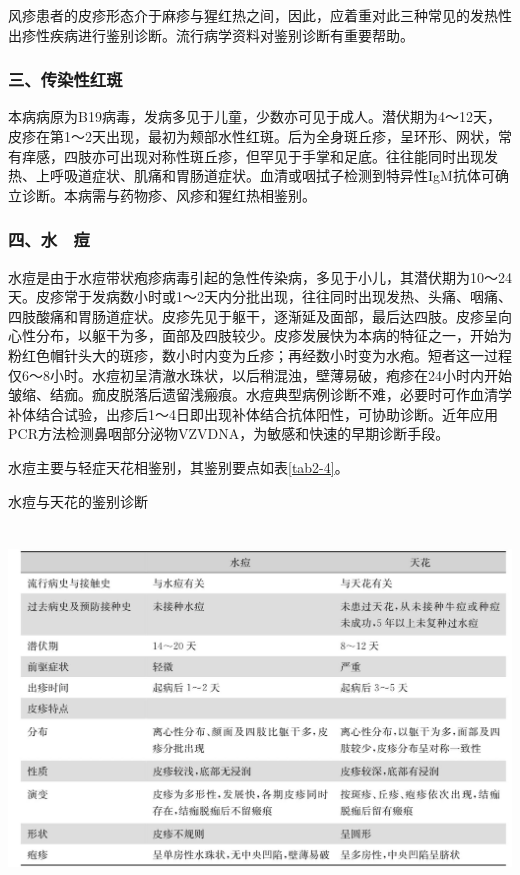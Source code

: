 风疹患者的皮疹形态介于麻疹与猩红热之间，因此，应着重对此三种常见的发热性出疹性疾病进行鉴别诊断。流行病学资料对鉴别诊断有重要帮助。

\subsubsection{三、传染性红斑}

本病病原为B19病毒，发病多见于儿童，少数亦可见于成人。潜伏期为4～12天，皮疹在第1～2天出现，最初为颊部水性红斑。后为全身斑丘疹，呈环形、网状，常有痒感，四肢亦可出现对称性斑丘疹，但罕见于手掌和足底。往往能同时出现发热、上呼吸道症状、肌痛和胃肠道症状。血清或咽拭子检测到特异性IgM抗体可确立诊断。本病需与药物疹、风疹和猩红热相鉴别。

\subsubsection{四、水　痘}

水痘是由于水痘带状疱疹病毒引起的急性传染病，多见于小儿，其潜伏期为10～24天。皮疹常于发病数小时或1～2天内分批出现，往往同时出现发热、头痛、咽痛、四肢酸痛和胃肠道症状。皮疹先见于躯干，逐渐延及面部，最后达四肢。皮疹呈向心性分布，以躯干为多，面部及四肢较少。皮疹发展快为本病的特征之一，开始为粉红色帽针头大的斑疹，数小时内变为丘疹；再经数小时变为水疱。短者这一过程仅6～8小时。水痘初呈清澈水珠状，以后稍混浊，壁薄易破，疱疹在24小时内开始皱缩、结痂。痂皮脱落后遗留浅瘢痕。水痘典型病例诊断不难，必要时可作血清学补体结合试验，出疹后1～4日即出现补体结合抗体阳性，可协助诊断。近年应用PCR方法检测鼻咽部分泌物VZVDNA，为敏感和快速的早期诊断手段。

水痘主要与轻症天花相鉴别，其鉴别要点如表\ref{tab2-4}。

\begin{table}[htbp]
\centering
\caption{水痘与天花的鉴别诊断}
\label{tab2-4}
\includegraphics[width=6.04167in,height=3.8125in]{./images/Image00008.jpg}
\end{table}

